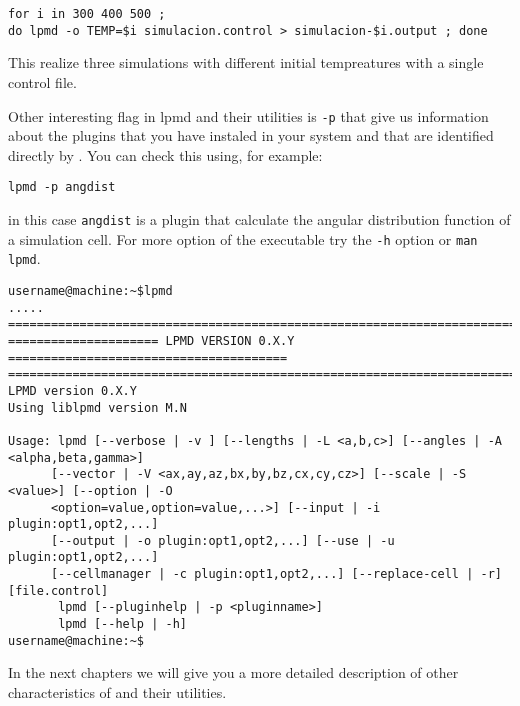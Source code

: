 \begin{center}
 \texttt{for i in 300 400 500 ; \\do lpmd -o TEMP=\$i simulacion.control > simulacion-\$i.output ; done}
\end{center}
\noindent
This realize three simulations with different initial tempreatures with a
single control file.

Other interesting flag in {\lpmd}lpmd and their utilities is \verb|-p| that give
us information about the plugins that you have instaled in your system and that
are identified directly by {\lpmd}. You can check this using, for example:

\begin{center}
 \texttt{lpmd -p angdist}
\end{center}
\noindent
in this case \verb|angdist| is a plugin that calculate the angular distribution
function of a simulation cell. For more option of the executable try the
\verb|-h| option or \verb|man lpmd|.

\begin{verbatim}
username@machine:~$lpmd
.....
================================================================================
===================== LPMD VERSION 0.X.Y =======================================
================================================================================
LPMD version 0.X.Y
Using liblpmd version M.N

Usage: lpmd [--verbose | -v ] [--lengths | -L <a,b,c>] [--angles | -A <alpha,beta,gamma>]
      [--vector | -V <ax,ay,az,bx,by,bz,cx,cy,cz>] [--scale | -S <value>] [--option | -O
      <option=value,option=value,...>] [--input | -i plugin:opt1,opt2,...]  
      [--output | -o plugin:opt1,opt2,...] [--use | -u plugin:opt1,opt2,...] 
      [--cellmanager | -c plugin:opt1,opt2,...] [--replace-cell | -r] [file.control]
       lpmd [--pluginhelp | -p <pluginname>]
       lpmd [--help | -h]
username@machine:~$ 
\end{verbatim}

In the next chapters we will give you a more detailed description of other
characteristics of {\lpmd} and their utilities.

